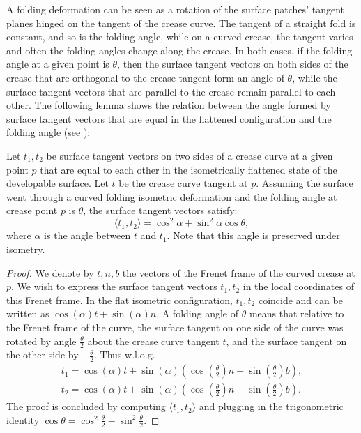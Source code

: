 A folding deformation can be seen as a rotation of the surface patches' tangent planes hinged on the tangent of the crease curve. The tangent of a straight fold is constant, and so is the folding angle, while on a curved crease, the tangent varies and often the folding angles change along the crease. In both cases, if the folding angle at a given point is $\theta$, then the surface tangent vectors on both sides of the crease that are orthogonal to the crease tangent form an angle of $\theta$, while the surface tangent vectors that are parallel to the crease remain parallel to each other. The following lemma shows the relation between the angle formed by surface tangent vectors that are equal in the flattened configuration and the folding angle (see ): 
\begin{lemma}  \label{lem:tangents_dihedral}
	Let $t_1,t_2$ be surface tangent vectors on two sides of a crease curve at a given point $p$ that are equal to each other in the isometrically flattened state of the developable surface. Let $t$ be the crease curve tangent at $p$. Assuming the surface went through a curved folding isometric deformation and the folding angle at crease point $p$  is $\theta$, the surface tangent vectors satisfy:
	\begin{equation} \label{eq:tangents_dihedral}
	\langle t_1, t_2 \rangle = \cos^2\!\alpha + \sin^2\!\alpha \cos\theta, \end{equation}
	where $\alpha$ is the angle between $t$ and $t_1$. Note that this angle is preserved under isometry.
\end{lemma}
\begin{proof}{We denote by $t,n,b$ the vectors of the Frenet frame of the curved crease at $p$. We wish to express the surface tangent vectors $t_1, t_2$ in the local coordinates of this Frenet frame. In the flat isometric configuration, $t_1, t_2$ coincide and can be written as $\cos(\alpha)t + \sin(\alpha)n$. A folding angle of $\theta$ means that relative to the Frenet frame of the curve, the surface tangent on one side of the curve was rotated by angle $\frac{\theta}{2}$ about the crease curve tangent $t$, and the surface tangent on the other side by  $-\frac{\theta}{2}$. 
		Thus w.l.o.g.\ 
		\begin{align*}
		\textstyle t_1 = \cos(\alpha)t + \sin(\alpha)\left(\cos\left(\frac{\theta}{2}\right)n + \sin\left(\frac{\theta}{2}\right)b\right),\\
		\textstyle t_2 = \cos(\alpha)t + \sin(\alpha)\left(\cos\left(\frac{\theta}{2}\right)n - \sin\left(\frac{\theta}{2}\right)b\right). 
		\end{align*}
		The proof is concluded by computing $\langle t_1,t_2 \rangle$ and plugging in the trigonometric identity $\cos\theta = \cos^2{\frac{\theta}{2}}-\sin^2\frac{\theta}{2}$.}\end{proof}



